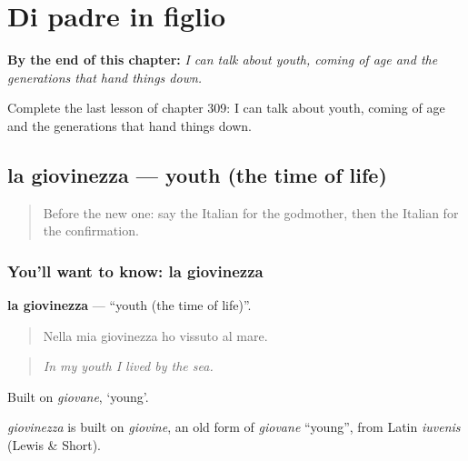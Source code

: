 
\chapter{Di padre in figlio}
\label{ch:it-di-padre-in-figlio}

\begin{chapteropening}
\textbf{By the end of this chapter:} \emph{I can talk about youth, coming of age and the generations that hand things down.}

Complete the last lesson of chapter 309: I can talk about youth, coming of age and the generations that hand things down.
\end{chapteropening}

\section[la giovinezza]{la giovinezza — youth (the time of life)}

\label{lesson:IT-C309-giovinezza}



\begin{quote}
Before the new one: say the Italian for the godmother, then the Italian for the confirmation.
\end{quote}

\subsection*{You'll want to know: la giovinezza}
\textbf{la giovinezza} — \textquotedblleft{}youth (the time of life)\textquotedblright{}.

\begin{quote}
Nella mia giovinezza ho vissuto al mare.
\end{quote}

\begin{quote}
\emph{In my youth I lived by the sea.}
\end{quote}

Built on \emph{giovane}, ‘young’.

\begin{cousinweb}
\emph{giovinezza} is built on \emph{giovine}, an old form of \emph{giovane} \textquotedblleft{}young\textquotedblright{}, from Latin \emph{iuvenis} (Lewis \& Short).
\end{cousinweb}

